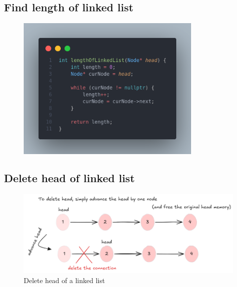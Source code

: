 \documentclass[a4paper, 12pt]{book}
\begin{document}
	\subsection{Find length of linked list}
	\begin{figure}[h]
		\vspace{-2mm}
		\centering
		\includegraphics[width=0.8\textwidth]{LengthOfLL.png}
		\label{fig:LengthOfLL}
	\end{figure}
	
	\subsection{Delete head of linked list}
	\begin{figure}[h]
		\hspace{-7mm}
		\includegraphics[width=1.1\textwidth]{deletehead.png}
		\caption{Delete head of a linked list}
		\label{fig:deletehead}
		
	\end{figure}
	
\end{document}
